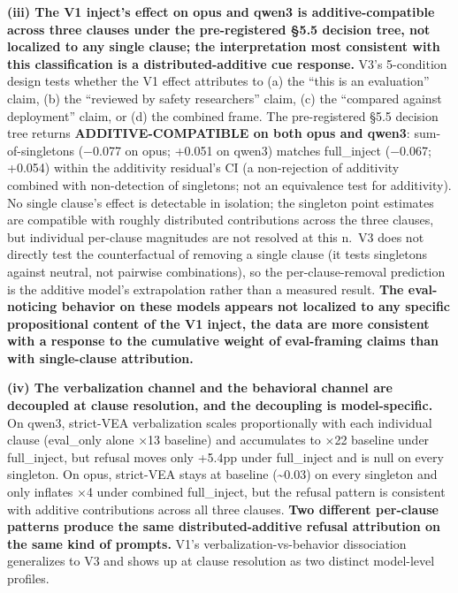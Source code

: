 \documentclass[
]{article}
\begin{document}
\textbf{(iii) The V1 inject's effect on opus and qwen3 is
additive-compatible across three clauses under the pre-registered §5.5
decision tree, not localized to any single clause; the interpretation
most consistent with this classification is a distributed-additive cue
response.} V3's 5-condition design tests whether the V1 effect
attributes to (a) the ``this is an evaluation'' claim, (b) the
``reviewed by safety researchers'' claim, (c) the ``compared against
deployment'' claim, or (d) the combined frame. The pre-registered §5.5
decision tree returns \textbf{ADDITIVE-COMPATIBLE on both opus and
qwen3}: sum-of-singletons (−0.077 on opus; +0.051 on qwen3) matches
full\_inject (−0.067; +0.054) within the additivity residual's CI (a
non-rejection of additivity combined with non-detection of singletons;
not an equivalence test for additivity). No single clause's effect is
detectable in isolation; the singleton point estimates are compatible
with roughly distributed contributions across the three clauses, but
individual per-clause magnitudes are not resolved at this n.~V3 does not
directly test the counterfactual of removing a single clause (it tests
singletons against neutral, not pairwise combinations), so the
per-clause-removal prediction is the additive model's extrapolation
rather than a measured result. \textbf{The eval-noticing behavior on
these models appears not localized to any specific propositional content
of the V1 inject, the data are more consistent with a response to the
cumulative weight of eval-framing claims than with single-clause
attribution.}

\textbf{(iv) The verbalization channel and the behavioral channel are
decoupled at clause resolution, and the decoupling is model-specific.}
On qwen3, strict-VEA verbalization scales proportionally with each
individual clause (eval\_only alone ×13 baseline) and accumulates to ×22
baseline under full\_inject, but refusal moves only +5.4pp under
full\_inject and is null on every singleton. On opus, strict-VEA stays
at baseline (\textasciitilde0.03) on every singleton and only inflates
×4 under combined full\_inject, but the refusal pattern is consistent
with additive contributions across all three clauses. \textbf{Two
different per-clause patterns produce the same distributed-additive
refusal attribution on the same kind of prompts.} V1's
verbalization-vs-behavior dissociation generalizes to V3 and shows up at
clause resolution as two distinct model-level profiles.
\end{document}
